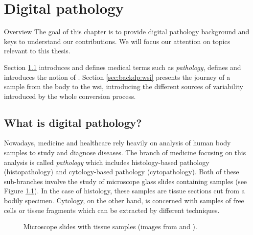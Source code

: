 \chapter{Digital pathology}
\label{chap:backdp}

\begin{overview}{Overview}
  The goal of this chapter is to provide digital pathology background  and keys to understand our contributions. We will focus our attention on topics relevant to this thesis. 
  
  Section \ref{sec:backdp:whatisdp} introduces and defines medical terms such as \textit{pathology}, defines  and introduces the notion of . Section \ref{sec:backdp:wsi} presents the journey of a sample from the body to the \acrshort{wsi}, introducing the different sources of variability introduced by the whole conversion process. 
\end{overview}


\section{What is digital pathology?}
\label{sec:backdp:whatisdp}

Nowadays, medicine and healthcare rely heavily on analysis of human body samples to study and diagnose diseases. The branch of medicine focusing on this analysis is called \textit{pathology} which includes histology-based pathology (\aka histopathology) and cytology-based pathology (\aka cytopathology). Both of these sub-branches involve the study of microscope glass slides containing samples (see Figure \ref{fig:backdp:glassslides}). In the case of histology, these samples are tissue sections cut from a bodily specimen. Cytology, on the other hand, is concerned with samples of free cells or tissue fragments which can be extracted by different techniques. 

\begin{figure}
  \centering
  \quad
  \caption{Microscope slides with tissue samples (images from \parencite{img:glassslides} and ).}
  \label{fig:backdp:glassslides}
\end{figure}

